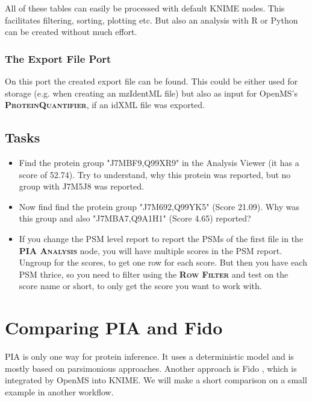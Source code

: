 \documentclass[a4paper,11pt,twoside]{article}
\newcommand{\knimenode}[1]{{\scshape\bfseries #1}}
\begin{document}
All of these tables can easily be processed with default KNIME nodes. This
facilitates filtering, sorting, plotting etc. But also an analysis with R or
Python can be created without much effort.


\subsubsection{The Export File Port}

On this port the created export file can be found. This could be either used
for storage (e.g. when creating an mzIdentML file) but also as input for
OpenMS's \knimenode{ProteinQuantifier}, if an idXML file was exported.


\subsection{Tasks}

\begin{itemize}
	\item Find the protein group "J7MBF9,Q99XR9" in the Analysis Viewer (it has
	a score of 52.74). Try to understand, why this protein was reported, but no
	group with J7M5J8 was reported.

	\item Now find find the protein group "J7M692,Q99YK5" (Score 21.09). Why
	was this group and also "J7MBA7,Q9A1H1" (Score 4.65) reported?

	\item If you change the PSM level report to report the PSMs of the first
	file in the 	\knimenode{PIA  Analysis} node, you will have multiple
	scores in the PSM report. Ungroup for the scores, to get one row for each
	score. But then you have each PSM thrice, so you need to filter using the
	\knimenode{Row Filter} and test on the score name or short, to only get the
	score you want to work with.
\end{itemize}



\newpage
\section{Comparing PIA and Fido}

PIA is only one way for protein inference. It uses a deterministic model and is
mostly based on parsimonious approaches. Another approach is Fido
\cite{serang2010}, which is integrated by OpenMS into KNIME. We will make a
short comparison on a small example in another workflow.
\end{document}
